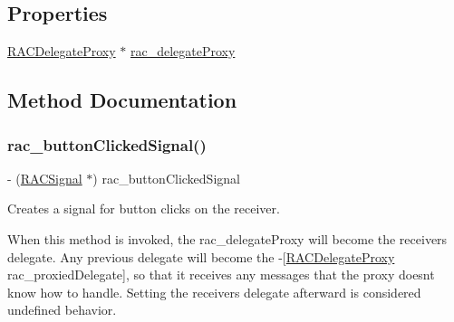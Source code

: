 \subsection*{Properties}
\begin{DoxyCompactItemize}
\item 
\mbox{\hyperlink{interface_r_a_c_delegate_proxy}{R\+A\+C\+Delegate\+Proxy}} $\ast$ \mbox{\hyperlink{category_u_i_action_sheet_07_r_a_c_signal_support_08_a193e14324507d876cfc00fe2f5614193}{rac\+\_\+delegate\+Proxy}}
\end{DoxyCompactItemize}


\subsection{Method Documentation}
\mbox{\label{category_u_i_action_sheet_07_r_a_c_signal_support_08_a0b67dde5b07b850d24d70d030c80dd1b}} 
\subsubsection{\texorpdfstring{rac\+\_\+button\+Clicked\+Signal()}{rac\_buttonClickedSignal()}\hspace{0.1cm}{\footnotesize\ttfamily [1/3]}}
{\footnotesize\ttfamily -\/ (\mbox{\hyperlink{interface_r_a_c_signal}{R\+A\+C\+Signal}} $\ast$) rac\+\_\+button\+Clicked\+Signal \begin{DoxyParamCaption}{ }\end{DoxyParamCaption}}

Creates a signal for button clicks on the receiver.

When this method is invoked, the {\ttfamily rac\+\_\+delegate\+Proxy} will become the receiver\textquotesingle{}s delegate. Any previous delegate will become the -\/\mbox{[}\mbox{\hyperlink{interface_r_a_c_delegate_proxy}{R\+A\+C\+Delegate\+Proxy}} rac\+\_\+proxied\+Delegate\mbox{]}, so that it receives any messages that the proxy doesn\textquotesingle{}t know how to handle. Setting the receiver\textquotesingle{}s {\ttfamily delegate} afterward is considered undefined behavior.

